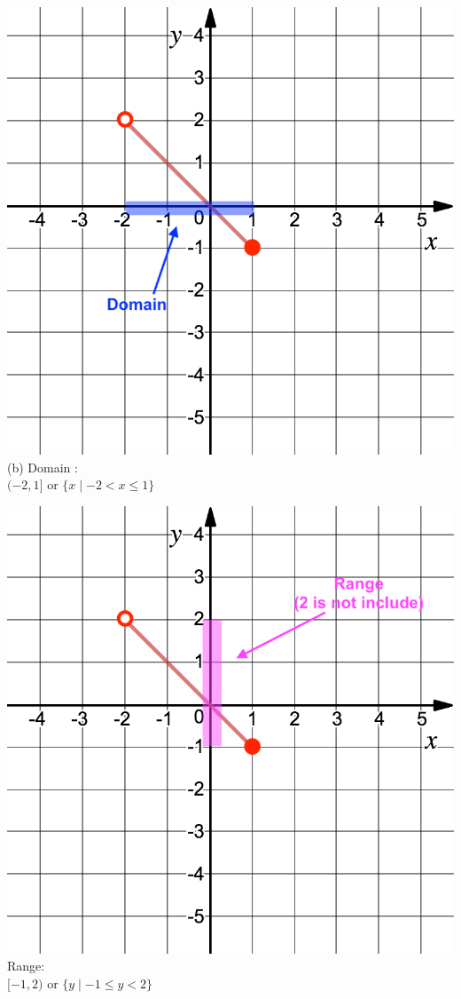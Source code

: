 \vspace{0.4cm}
\noindent\begin{minipage}{0.4\textwidth}%
\includegraphics[width=\linewidth]{Pics/ex4_b_D.png}
(b) Domain :\\ $(-2,1]$ or $\{x \mid -2 < x \le 1\}$
\end{minipage}%
\hfill%
\begin{minipage}{0.4\textwidth}
\includegraphics[width=\linewidth]{Pics/ex4_b_R.png}
Range:\\ $[-1,2)$ or $\{y \mid -1 \le y < 2\}$
\end{minipage}
%


